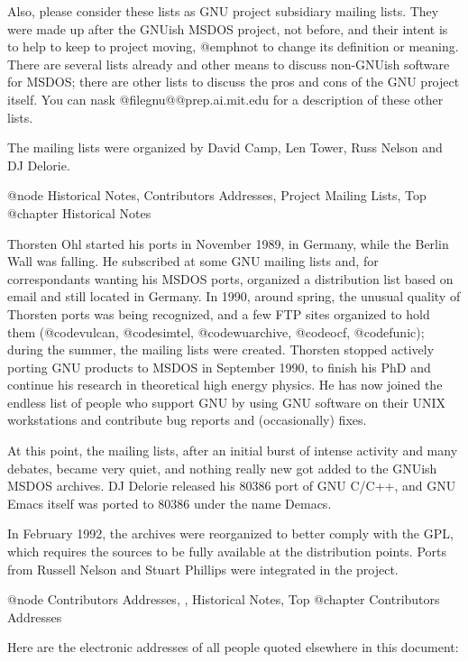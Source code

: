 Also, please consider these lists as GNU project subsidiary mailing
lists.  They were made up after the GNUish MSDOS project, not before,
and their intent is to help to keep to project moving, @emph{not} to
change its definition or meaning.  There are several lists already and
other means to discuss non-GNUish software for MSDOS; there are other
lists to discuss the pros and cons of the GNU project itself.  You can
nask @file{gnu@@prep.ai.mit.edu} for a description of these other
lists.

The mailing lists were organized by David Camp, Len Tower, Russ
Nelson and DJ Delorie.


@node Historical Notes, Contributors Addresses, Project Mailing Lists, Top
@chapter Historical Notes

Thorsten Ohl started his ports in November 1989, in Germany, while the
Berlin Wall was falling.  He subscribed at some GNU mailing lists and,
for correspondants wanting his MSDOS ports, organized a distribution
list based on email and still located in Germany.  In 1990, around
spring, the unusual quality of Thorsten ports was being recognized, and
a few FTP sites organized to hold them (@code{vulcan}, @code{simtel},
@code{wuarchive}, @code{ocf}, @code{funic}); during the summer, the
mailing lists were created.  Thorsten stopped actively porting GNU
products to MSDOS in September 1990, to finish his PhD and continue his
research in theoretical high energy physics.  He has now joined the
endless list of people who support GNU by using GNU software on their
UNIX workstations and contribute bug reports and (occasionally) fixes.

At this point, the mailing lists, after an initial burst of intense
activity and many debates, became very quiet, and nothing really new got
added to the GNUish MSDOS archives.  DJ Delorie released his 80386 port
of GNU C/C++, and GNU Emacs itself was ported to 80386 under the name
Demacs.

In February 1992, the archives were reorganized to better comply with
the GPL, which requires the sources to be fully available at the
distribution points.  Ports from Russell Nelson and Stuart Phillips were
integrated in the project.


@node Contributors Addresses,  , Historical Notes, Top
@chapter Contributors Addresses

Here are the electronic addresses of all people quoted elsewhere in
this document:

